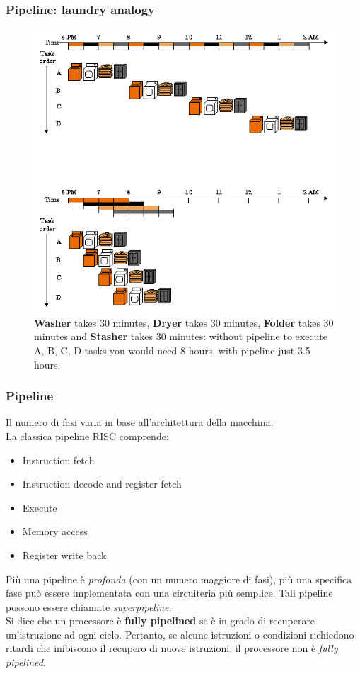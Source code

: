 \begin{frame}
	\frametitle{ Pipeline: laundry analogy}

				
		\begin{figure}[!htbp]
			\centering 
			\includegraphics[width=0.5\linewidth]{images/7_pipeline/laundry_analogy.png}
			\caption{\textbf{Washer} takes 30 minutes, \textbf{Dryer} takes 30 minutes, \textbf{Folder} takes 30 minutes and \textbf{Stasher} takes 30 minutes: without pipeline to execute A, B, C, D tasks you would need 8 hours, with pipeline just 3.5 hours.}
		\end{figure}

\end{frame}



\begin{frame}
	\frametitle{ Pipeline}

		Il numero di fasi varia in base all'architettura della macchina.\\
		La classica pipeline RISC comprende:
		\begin{itemize}
			\item Instruction fetch
			\item Instruction decode and register fetch
			\item Execute
			\item Memory access
			\item Register write back
		\end{itemize}
		
		Più una pipeline è \textit{profonda} (con un numero maggiore di fasi), più una specifica fase può essere implementata con una circuiteria più semplice. Tali pipeline possono essere chiamate \textit{superpipeline}.\\
		Si dice che un processore è \textbf{fully pipelined} se è in grado di recuperare un'istruzione ad ogni ciclo. Pertanto, se alcune istruzioni o condizioni richiedono ritardi che inibiscono il recupero di nuove istruzioni, il processore non è \textit{fully pipelined}.

\end{frame}


